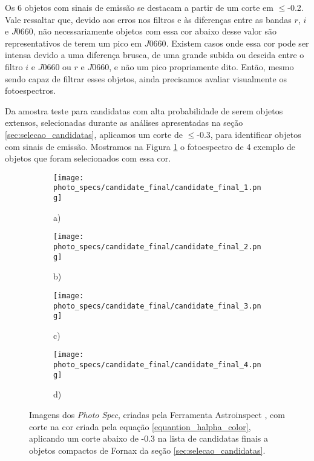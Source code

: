 Os 6 objetos com sinais de emissão se destacam a partir de um corte em $\leq$-0.2. Vale ressaltar que, devido aos erros nos filtros e às diferenças entre as bandas $r$, $i$ e $J0660$, não necessariamente objetos com essa cor abaixo desse valor são representativos de terem um pico em $J0660$. Existem casos onde essa cor pode ser intensa devido a uma diferença brusca, de uma grande subida ou descida entre o filtro $i$ e $J0660$ ou $r$ e $J0660$, e não um pico propriamente dito. Então, mesmo sendo capaz de filtrar esses objetos, ainda precisamos avaliar visualmente os fotoespectros.

Da amostra teste para candidatas com alta probabilidade de serem objetos extensos, selecionadas durante as análises apresentadas na seção \ref{sec:selecao_candidatas}, aplicamos um corte de $\leq$-0.3, para identificar objetos com sinais de emissão. Mostramos na Figura \ref{halpha_candidatas_final} o fotoespectro de 4 exemplo de objetos que foram selecionados com essa cor.

\begin{figure}[!ht]
    \centering
    \captionsetup{justification=centering}
    \begin{subfigure}[b]{0.45\textwidth}
        \texttt{[image: photo\_specs/candidate\_final/candidate\_final\_1.png]}
        \caption{a)}
    \end{subfigure}
    \begin{subfigure}[b]{0.45\textwidth}
        \texttt{[image: photo\_specs/candidate\_final/candidate\_final\_2.png]}
        \caption{b)}
    \end{subfigure}
    \begin{subfigure}[b]{0.45\textwidth}
        \texttt{[image: photo\_specs/candidate\_final/candidate\_final\_3.png]}
        \caption{c)}
    \end{subfigure}
    \begin{subfigure}[b]{0.45\textwidth}
        \texttt{[image: photo\_specs/candidate\_final/candidate\_final\_4.png]}
        \caption{d)}
    \end{subfigure}
    \caption{Imagens dos \textit{Photo Spec}, criadas pela Ferramenta Astroinspect \cite{astroinspect}, com corte na cor criada pela equação \ref{equantion_halpha_color}, aplicando um corte abaixo de -0.3 na lista de candidatas finais a objetos compactos de Fornax da seção \ref{sec:selecao_candidatas}.}
    \label{halpha_candidatas_final}
\end{figure}

